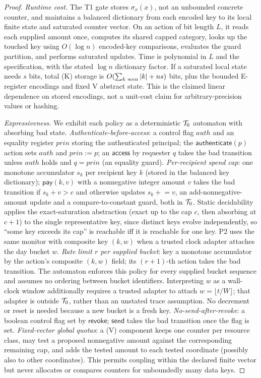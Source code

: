 \begin{proof}
\emph{Runtime cost.} The T1 gate stores $\sigma_x(x)$, not an unbounded concrete
counter, and maintains a balanced dictionary from each encoded key to its local
finite state and saturated counter vector. On an action of bit length $L$, it
reads each supplied amount once, computes its shared capped category, looks up
the touched key using $O(\log n)$ encoded-key comparisons, evaluates the guard
partition, and performs saturated updates. Time is polynomial in $L$ and the
specification, with the stated $\log n$ dictionary factor. If a saturated local
state needs $s$ bits, total (K) storage is
$O(\sum_{k\ {\rm seen}}|k|+ns)$ bits, plus the bounded E-register encodings and
fixed V abstract state. This is the claimed linear dependence on stored
encodings, not a unit-cost claim for arbitrary-precision values or hashing.

\emph{Expressiveness.} We exhibit each policy as a deterministic $\mathcal{T}_0$
automaton with absorbing bad state.
\emph{Authenticate-before-access}: a control flag $\mathit{auth}$ and an
equality register $\mathit{prin}$ storing the authenticated principal; the
$\mathsf{authenticate}(p)$ action sets $\mathit{auth}$ and $\mathit{prin}:=p$; an
$\mathsf{access}$ by requester $q$ takes the bad transition unless $\mathit{auth}$
holds and $q=\mathit{prin}$ (an equality guard).
\emph{Per-recipient spend cap}: one monotone accumulator $s_k$ per recipient
key $k$ (stored in the balanced key dictionary); $\mathsf{pay}(k,v)$ with a nonnegative integer amount
$v$ takes the bad transition if $s_k+v>c$ and otherwise updates $s_k\mathrel{+}=v$, an
add-nonnegative-amount update and a compare-to-constant guard, both in $\mathcal{T}_0$. Static
decidability applies the exact-saturation abstraction (exact up to the cap $c$, then absorbing
at $c{+}1$) to the single representative key, since distinct keys evolve independently, so ``some
key exceeds its cap'' is reachable iff it is reachable for one key. P2 uses the
same monitor with composite key $(k,w)$ when a trusted clock adapter attaches
the day bucket $w$.
\emph{Rate limit $r$ per supplied bucket}: key a monotone accumulator by
the action's composite $(k,w)$ field; its $(r{+}1)$-th action takes the bad
transition. The automaton enforces this policy for every supplied bucket
sequence and assumes no ordering between bucket identifiers. Interpreting
$w$ as a wall-clock window additionally requires a trusted adapter to attach
$w=\lfloor t/W\rfloor$; that adapter is outside $\mathcal{T}_0$, rather than an
unstated trace assumption. No decrement or reset is needed because a new
bucket is a fresh key.
\emph{No-send-after-revoke}: a boolean control flag set by $\mathsf{revoke}$;
$\mathsf{send}$ takes the bad transition once the flag is set.
\emph{Fixed-vector global quotas}: a (V) component keeps one counter per
resource class, may test a proposed nonnegative amount against the corresponding
remaining cap, and adds the tested amount to each tested coordinate (possibly also to other coordinates). This permits coupling
within the declared finite vector but never allocates or compares counters for
unboundedly many data keys.
\end{proof}

